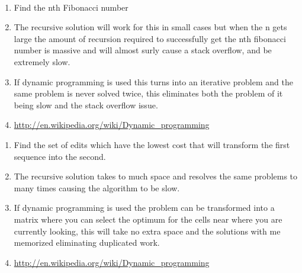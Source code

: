 \documentclass[11pt]{article}
\begin{document}
	 \\
	\begin{enumerate}
		\item Find the nth Fibonacci number
		\item The recursive solution will work for this in small cases but when the n gets large the amount of recursion required to successfully get the nth fibonacci number is massive and will almost surly cause a stack overflow, and be extremely slow.
		\item If dynamic programming is used this turns into an iterative problem and the same problem is never solved twice, this eliminates both the problem of it being slow and the stack overflow issue.
		\item \url{http://en.wikipedia.org/wiki/Dynamic_programming}
	\end{enumerate}
	
	\begin{enumerate}
		\item Find the set of edits which have the lowest cost that will transform the first sequence into the second.
		\item The recursive solution takes to much space and resolves the same problems to many times causing the algorithm to be slow.
		\item If dynamic programming is used the problem can be transformed into a matrix where you can select the optimum for the cells near where you are currently looking, this will take no extra space and the solutions with me memorized eliminating duplicated work.
		\item \url{http://en.wikipedia.org/wiki/Dynamic_programming}
	\end{enumerate}
\end{document}

